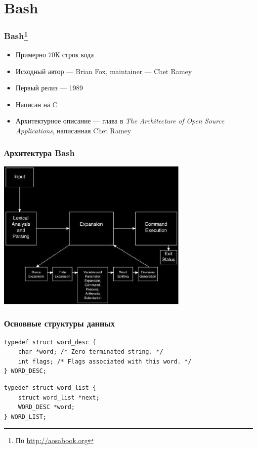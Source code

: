 \documentclass{../cscslides}
\begin{document}
    \section{Bash}

    \begin{frame}
        \frametitle{Bash\footnote{\tiny{По \url{http://aosabook.org}}}}
        \begin{itemize}
            \item Примерно 70К строк кода
            \item Исходный автор --- Brian Fox, maintainer --- Chet Ramey
            \item Первый релиз --- 1989
            \item Написан на C
            \item Архитектурное описание --- глава в \textit{The Architecture of Open Source Applications}, написанная Chet Ramey
        \end{itemize}
    \end{frame}

    \begin{frame}
        \frametitle{Архитектура Bash}
        \begin{center}
            \includegraphics[width=0.7\textwidth]{bashArchitectureBlack.png}
        \end{center}
    \end{frame}

    \begin{frame}[fragile]
        \frametitle{Основные структуры данных}
        \begin{verbatim}
typedef struct word_desc {
    char *word; /* Zero terminated string. */
    int flags; /* Flags associated with this word. */
} WORD_DESC;
        \end{verbatim}

        \vspace{3mm}

        \begin{verbatim}
typedef struct word_list {
    struct word_list *next;
    WORD_DESC *word;
} WORD_LIST;
        \end{verbatim}
    \end{frame}
\end{document}
